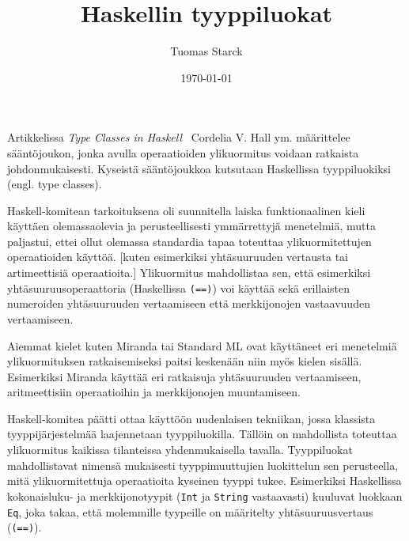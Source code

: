 \documentclass[finnish]{tktltiki2}
\title{Haskellin tyyppiluokat}
\author{Tuomas Starck}
\date{\today}
\begin{document}
\frontmatter

\maketitle
\makeabstract

\tableofcontents

\mainmatter

Artikkelissa \emph{Type Classes in Haskell}~\cite{Hall:1996:TCH:227699.227700} Cordelia V. Hall ym. määrittelee sääntöjoukon, jonka avulla operaatioiden ylikuormitus voidaan ratkaista johdonmukaisesti. Kyseistä sääntöjoukkoa kutsutaan Haskellissa tyyppiluokiksi (engl. type classes).

Haskell-komitean tarkoituksena oli suunnitella laiska funktionaalinen kieli käyttäen olemassaolevia ja perusteellisesti ymmärrettyjä menetelmiä, mutta paljastui, ettei ollut olemassa standardia tapaa toteuttaa ylikuormitettujen operaatioiden käyttöä. [kuten esimerkiksi yhtäsuuruuden vertausta tai artimeettisiä operaatioita.] Ylikuormitus mahdollistaa sen, että esimerkiksi yhtäsuuruusoperaattoria (Haskellissa \texttt{(==)}) voi käyttää sekä erillaisten numeroiden yhtäsuuruuden vertaamiseen että merkkijonojen vastaavuuden vertaamiseen.

Aiemmat kielet kuten Miranda tai Standard ML ovat käyttäneet eri menetelmiä ylikuormituksen ratkaisemiseksi paitsi keskenään niin myös kielen sisällä. Esimerkiksi Miranda käyttää eri ratkaisuja yhtäsuuruuden vertaamiseen, aritmeettisiin operaatioihin ja merkkijonojen muuntamiseen.

Haskell-komitea päätti ottaa käyttöön uudenlaisen tekniikan, jossa klassista tyyppijärjestelmää laajennetaan tyyppiluokilla. Tällöin on mahdollista toteuttaa ylikuormitus kaikissa tilanteissa yhdenmukaisella tavalla. Tyyppiluokat mahdollistavat nimensä mukaisesti tyyppimuuttujien luokittelun sen perusteella, mitä ylikuormitettuja operaatioita kyseinen tyyppi tukee. Esimerkiksi Haskellissa kokonaisluku- ja merkkijonotyypit (\texttt{Int} ja \texttt{String} vastaavasti) kuuluvat luokkaan \texttt{Eq}, joka takaa, että molemmille tyypeille on määritelty yhtäsuuruusvertaus (\texttt{(==)}).








\end{document}
